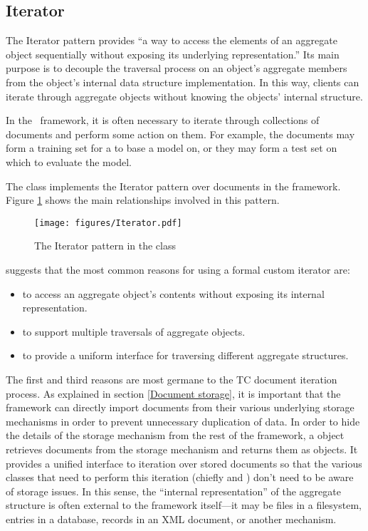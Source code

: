 \subsection{Iterator}

The Iterator pattern provides ``a way to access the elements of an
aggregate object sequentially without exposing its underlying
representation.'' \cite[p. 257]{gamma:95} Its main purpose is to
decouple the traversal process on an object's aggregate members from
the object's internal data structure implementation.  In this way,
clients can iterate through aggregate objects without knowing the
objects' internal structure.

In the \aicat\ framework, it is often necessary to iterate
through collections of documents and perform some action on them.  For
example, the documents may form a training set for a  to base a
model on, or they may form a test set on which to evaluate the model.

The  class implements the Iterator pattern
\cite[p. 257]{gamma:95} over documents in the framework.  Figure
\ref{Iterator-collection} shows the main relationships involved in
this pattern.

\begin{figure}
\texttt{[image: figures/Iterator.pdf]}
\caption{The Iterator pattern in the  class}
\label{Iterator-collection}
\end{figure}


\cite[p. 259]{gamma:95} suggests that the most common reasons for
using a formal custom iterator are:

\begin{itemize}

\item to access an aggregate object's contents without exposing its
internal representation.

\item to support multiple traversals of aggregate objects.

\item to provide a uniform interface for traversing different
aggregate structures.

\end{itemize}

The first and third reasons are most germane to the TC document iteration
process.  As explained in section \ref{Document storage}, it is
important that the framework can directly import documents from their
various underlying storage mechanisms in order to prevent unnecessary
duplication of data.  In order to hide the details of the storage
mechanism from the rest of the framework, a  object
retrieves documents from the storage mechanism and returns them
as  objects.  It provides a unified interface to iteration
over stored documents so that the various classes that need to perform
this iteration (chiefly  and ) don't need to be
aware of storage issues.  In this sense, the ``internal
representation'' of the aggregate structure is often external to the
framework itself---it may be files in a filesystem, entries in a
database, records in an XML document, or another mechanism.

